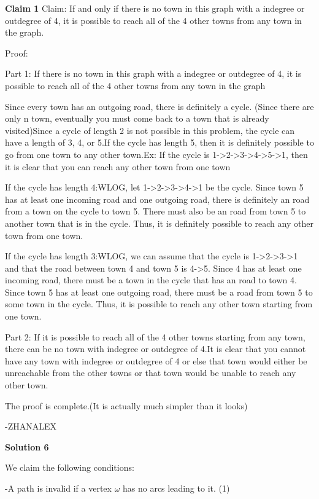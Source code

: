 \begin{enumerate}
 \textbf{Claim 1} Claim: If and only if there is no town in this graph with a indegree or outdegree of 4, it is possible to reach all of the 4 other towns from any town in the graph.

 Proof:

 Part 1: If there is no town in this graph with a indegree or outdegree of 4, it is possible to reach all of the 4 other towns from any town in the graph

 Since every town has an outgoing road, there is definitely a cycle. (Since there are only n town, eventually you must come back to a town that is already visited)Since a cycle of length 2 is not possible in this problem, the cycle can have a length of 3, 4, or 5.If the cycle has length 5, then it is definitely possible to go from one town to any other town.Ex: If the cycle is 1->2->3->4->5->1, then it is clear that you can reach any other town from one town

 If the cycle has length 4:WLOG, let 1->2->3->4->1 be the cycle. Since town 5 has at least one incoming road and one outgoing road, there is definitely an road from a town on the cycle to town 5. There must also be an road from town 5 to another town that is in the cycle. Thus, it is definitely possible to reach any other town from one town.

 If the cycle has length 3:WLOG, we can assume that the cycle is 1->2->3->1 and that the road between town 4 and town 5 is 4->5. Since 4 has at least one incoming road, there must be a town in the cycle that has an road to town 4. Since town 5 has at least one outgoing road, there must be a road from town 5 to some town in the cycle. Thus, it is possible to reach any other town starting from one town.

 
Part 2: If it is possible to reach all of the 4 other towns starting from any town, there can be no town with indegree or outdegree of 4.It is clear that you cannot have any town with indegree or outdegree of 4 or else that town would either be unreachable from the other towns or that town would be unable to reach any other town.

 The proof is complete.(It is actually much simpler than it looks)

 -ZHANALEX

 



\textbf{Solution 6}

We claim the following conditions:

 -A path is invalid if a vertex $\omega$ has no arcs leading to it. (1)


\end{enumerate}

